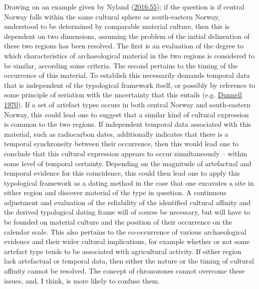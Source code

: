 \documentclass[
  a4paper,
  oneside]{uiophdthesis}
\begin{document}
Drawing on an example given by Nyland (\protect\hyperlink{ref-nyland2016}{2016:55}); if the question is if central Norway falls within the same cultural sphere as south-eastern Norway, understood to be determined by comparable material culture, then this is dependent on two dimensions, assuming the problem of the initial delineation of these two regions has been resolved. The first is an evaluation of the degree to which characteristics of archaeological material in the two regions is considered to be similar, according some criteria. The second pertains to the timing of the occurrence of this material. To establish this necessarily demands temporal data that is independent of the typological framework itself, or possibly by reference to some principle of seriation with the uncertainty that this entails (e.g. \protect\hyperlink{ref-dunnell1970}{Dunnell 1970}). If a set of artefact types occurs in both central Norway and south-eastern Norway, this could lead one to suggest that a similar kind of cultural expression is common to the two regions. If independent temporal data associated with this material, such as radiocarbon dates, additionally indicates that there is a temporal synchroneity between their occurrence, then this would lead one to conclude that this cultural expression appears to occur simultaneously -- within some level of temporal certainty. Depending on the magnitude of artefactual and temporal evidence for this coincidence, this could then lead one to apply this typological framework as a dating method in the case that one excavates a site in either region and discover material of the type in question. A continuous adjustment and evaluation of the reliability of the identified cultural affinity and the derived typological dating frame will of course be necessary, but will have to be founded on material culture and the position of their occurrence on the calendar scale. This also pertains to the co-occurrence of various archaeological evidence and their wider cultural implications, for example whether or not some artefact type tends to be associated with agricultural activity. If either region lack artefactual or temporal data, then either the nature or the timing of cultural affinity cannot be resolved. The concept of chronozones cannot overcome these issues, and, I think, is more likely to confuse them.
\end{document}
